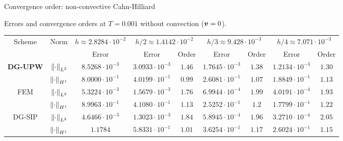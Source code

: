 \begin{frame}{Convergence order: non-convective Cahn-Hilliard}
	\begin{table}
		\begin{center}
				\fontsize{4pt}{6pt}\selectfont
				{\footnotesize{} Errors and convergence orders at $T=0.001$ without convection ($\boldsymbol{v}=0$).\vspace*{0.3cm} }
				\begin{tabular}{ccccccccc}
					\toprule
					\multirow{2}[2]{*}{Scheme} & \multirow{2}[2]{*}{Norm}& $h\approx 2.8284\cdot 10^{-2}$ & \multicolumn{2}{c}{$h/2\approx 1.4142\cdot 10^{-2}$} & \multicolumn{2}{c}{$h/3\approx 9.428\cdot 10^{-3}$} &\multicolumn{2}{c}{$h/4\approx 7.071\cdot 10^{-3}$} \\
					\cline{3-9}
					&&Error &Error & Order &  Error & Order &  Error & Order \\
					\midrule
					\multirow{2}[2]{*}{\textbf{DG-UPW}} & $\left\|\cdot\right\|_{L^2}$ & $8.5268\cdot 10^{-3}$ &$3.0933\cdot 10^{-3}$ & $1.46$ &$1.7645\cdot 10^{-3}$  & $1.38$  &$1.2134\cdot 10^{-3}$ & $1.30$   \\
					\cline{2-9}
					& $\left\|\cdot\right\|_{H^1}$ &$8.0000\cdot 10^{-1}$  &$4.0199\cdot 10^{-1}$  & $0.99$ &$2.6081\cdot 10^{-1}$ & $1.07$  &$1.8849\cdot 10^{-1}$ & $1.13$   \\
					\midrule
					\multirow{2}[2]{*}{FEM}  & $\left\|\cdot\right\|_{L^2}$ &$5.3224\cdot 10^{-3}$  &$1.5679\cdot 10^{-3}$ &$1.76$ &$6.9944\cdot 10^{-4}$  &$1.99$ &$4.0191\cdot 10^{-4}$ & $1.93$ \\
					\cline{2-9}
					& $\left\|\cdot\right\|_{H^1}$ &$8.9963\cdot 10^{-1}$  & $4.1080\cdot 10^{-1}$ & $1.13$  &$2.5252\cdot 10^{-1}$  & $1.2$   &$1.7799\cdot 10^{-1}$  & $1.22$  \\
					\midrule
					\multirow{2}[2]{*}{DG-SIP}  & $\left\|\cdot\right\|_{L^2}$ &$4.6466\cdot 10^{-3}$  &$1.3023\cdot 10^{-3}$  & $1.84$  &$5.8945\cdot 10^{-4}$ & $1.96$ &$3.2710\cdot 10^{-4}$ & $2.05$   \\
					\cline{2-9}
					& $\left\|\cdot\right\|_{H^1}$ &$1.1784$  &$5.8331\cdot 10^{-1}$  & $1.01$  &$3.6254\cdot 10^{-1}$ & $1.17$  &$2.6024\cdot 10^{-1}$ &$1.15$ \\
					\bottomrule
				\end{tabular}
		\end{center}
	\end{table}
\end{frame}

